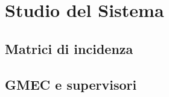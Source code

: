 \chapter{Studio del Sistema}
\label{cap:cap4}
\lhead{\textbf{\rightmark}}


\section{Matrici di incidenza}
\label{sec:4.1}

\newpage

\section{GMEC e supervisori}
\label{sec:4.2}

\newpage